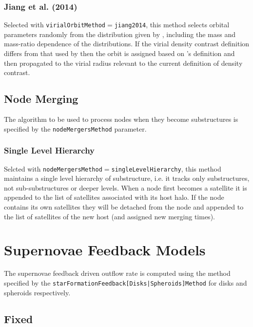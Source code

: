 \subsubsection{Jiang et al. (2014)}\label{phys:virialOrbit:virialOrbitJiang2014}

Selected with {\tt virialOrbitMethod}$=${\tt jiang2014}, this method selects orbital parameters randomly from the distribution given by \cite{jiang_orbital_2014}, including the mass and mass-ratio dependence of the distributions. If the virial density contrast definition differs from that used by \cite{jiang_orbital_2014_} then the orbit is assigned based on \cite{jiang_orbital_2014}'s definition and then propagated to the virial radius relevant to the current definition of density contrast.

\subsection{Node Merging}

The algorithm to be used to process nodes when they become substructures is specified by the {\tt nodeMergersMethod} parameter.

\subsubsection{Single Level Hierarchy}

Selcted with {\tt nodeMergersMethod}$=${\tt singleLevelHierarchy}, this method maintains a single level hierarchy of substructure, i.e. it tracks only substructures, not sub-substructures or deeper levels. When a \gls{node} first becomes a satellite it is appended to the list of satellites associated with its host halo. If the \gls{node} contains its own satellites they will be detached from the \gls{node} and appended to the list of satellites of the new host (and assigned new merging times).

\section{Supernovae Feedback Models}\label{sec:sneFeedback}

The supernovae feedback driven outflow rate is computed using the method specified by the {\tt starFormationFeedback[Disks|Spheroids]Method} for disks and spheroids respectively.

\subsection{Fixed}

